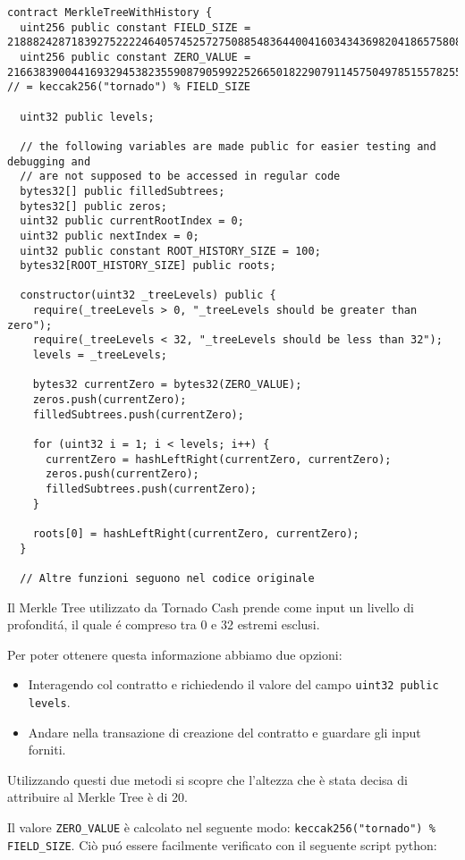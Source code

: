 \begin{lstlisting}
contract MerkleTreeWithHistory {
  uint256 public constant FIELD_SIZE = 21888242871839275222246405745257275088548364400416034343698204186575808495617;
  uint256 public constant ZERO_VALUE = 21663839004416932945382355908790599225266501822907911457504978515578255421292; // = keccak256("tornado") % FIELD_SIZE

  uint32 public levels;

  // the following variables are made public for easier testing and debugging and
  // are not supposed to be accessed in regular code
  bytes32[] public filledSubtrees;
  bytes32[] public zeros;
  uint32 public currentRootIndex = 0;
  uint32 public nextIndex = 0;
  uint32 public constant ROOT_HISTORY_SIZE = 100;
  bytes32[ROOT_HISTORY_SIZE] public roots;

  constructor(uint32 _treeLevels) public {
    require(_treeLevels > 0, "_treeLevels should be greater than zero");
    require(_treeLevels < 32, "_treeLevels should be less than 32");
    levels = _treeLevels;

    bytes32 currentZero = bytes32(ZERO_VALUE);
    zeros.push(currentZero);
    filledSubtrees.push(currentZero);

    for (uint32 i = 1; i < levels; i++) {
      currentZero = hashLeftRight(currentZero, currentZero);
      zeros.push(currentZero);
      filledSubtrees.push(currentZero);
    }

    roots[0] = hashLeftRight(currentZero, currentZero);
  }

  // Altre funzioni seguono nel codice originale
\end{lstlisting}

Il Merkle Tree utilizzato da Tornado Cash prende come input un livello di profonditá, il quale é compreso tra 0 e 32 estremi esclusi.

Per poter ottenere questa informazione abbiamo due opzioni:

\begin{itemize}
    \item Interagendo col contratto e richiedendo il valore del campo \verb|uint32 public levels|.
    \item Andare nella transazione di creazione del contratto e guardare gli input forniti.
\end{itemize}

Utilizzando questi due metodi si scopre che l'altezza che è stata decisa di attribuire al Merkle Tree è di 20.

Il valore \verb|ZERO_VALUE| è calcolato nel seguente modo: \verb|keccak256("tornado") % FIELD_SIZE|. Ciò puó essere facilmente verificato con il seguente script python:

